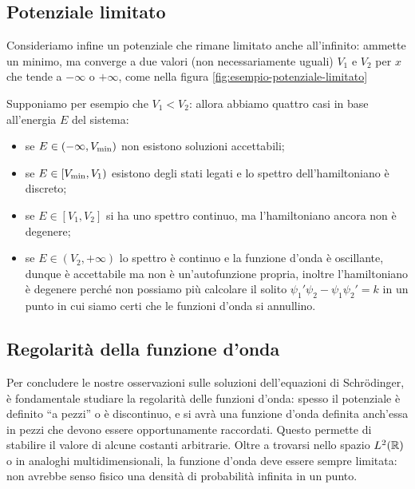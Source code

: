 \subsection{Potenziale limitato}
Consideriamo infine un potenziale che rimane limitato anche all'infinito: ammette un minimo, ma converge a due valori (non necessariamente uguali) $V_1$ e $V_2$ per $x$ che tende a $-\infty$ o $+\infty$, come nella figura \ref{fig:esempio-potenziale-limitato}

Supponiamo per esempio che $V_1<V_2$: allora abbiamo quattro casi in base all'energia $E$ del sistema:
\begin{itemize}
	\item se $E\in(-\infty,V_\textup{min})$ non esistono soluzioni accettabili;
	\item se $E\in[V_\textup{min},V_1)$ esistono degli stati legati e lo spettro dell'hamiltoniano è discreto;
	\item se $E\in[V_1,V_2]$ si ha uno spettro continuo, ma l'hamiltoniano ancora non è degenere;
	\item se $E\in(V_2,+\infty)$ lo spettro è continuo e la funzione d'onda è oscillante, dunque è accettabile ma non è un'autofunzione propria, inoltre l'hamiltoniano è degenere perch\'e non possiamo più calcolare il solito $\psi_1'\psi_2-\psi_1\psi_2'=k$ in un punto in cui siamo certi che le funzioni d'onda si annullino.
\end{itemize}

\subsection{Regolarità della funzione d'onda}
Per concludere le nostre osservazioni sulle soluzioni dell'equazioni di Schr\"odinger, è fondamentale studiare la regolarità delle funzioni d'onda: spesso il potenziale è definito ``a pezzi'' o è discontinuo, e si avrà una funzione d'onda definita anch'essa in pezzi che devono essere opportunamente raccordati.
Questo permette di stabilire il valore di alcune costanti arbitrarie.
Oltre a trovarsi nello spazio $\leb[2]{\R}$ o in analoghi multidimensionali, la funzione d'onda deve essere sempre limitata: non avrebbe senso fisico una densità di probabilità infinita in un punto.


